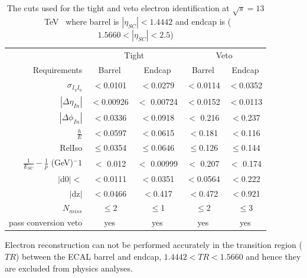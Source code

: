 \begin{table}[htpb!]
\footnotesize
\begin{center}
\begin{tabular}{|r|c|c|c|c|}
\hline
& \multicolumn{2}{c|}{Tight} & \multicolumn{2}{c|}{Veto} \\
\cline{2-5}
Requirements &  Barrel        &   Endcap  &  Barrel        &   Endcap  \\
\hline
$\sigma_{I_{\eta}I_{\eta}} $ & $ <$0.0101 & $ <$0.0279 & $ <$0.0114 & $ <$0.0352\\
$|\Delta \eta_{In}| $  & $ <$0.00926 &$ <$ 0.00724  & $ <$0.0152 & $ <$0.0113  \\
$|\Delta \phi_{In}|  $  &  $<$0.0336 & $<$0.0918 & $<$ 0.216 & $<$0.237  \\
$\frac{h}{E} $ &$<$0.0597 & $<$0.0615  &$<$0.181 & $<$0.116  \\
RelIso & $\leq$0.0354 & $\leq$0.0646& $\leq$0.126 & $\leq$0.144\\
$\frac{1}{E_{SC}} - \frac{1}{p}$ (GeV)$^-1$ & $<$ 0.012 & $<$ 0.00999  & $<$ 0.207 & $<$ 0.174 \\
$|$d$0| < $  & $<$0.0111 & $<$0.0351  & $<$0.0564 & $<$0.222\\
$|$dz$| $  & $<$0.0466 & $<$0.417 & $<$0.472 & $<$0.921\\
$N_{miss}$  & $\leq$2 & $\leq$1 & $\leq$2 & $\leq$3  \\
pass conversion veto & yes & yes& yes & yes  \\
\hline
\end{tabular}
\caption{The cuts used for the tight and veto electron identification at $\sqrt{s}=13$~TeV~\cite{electronID} where barrel is $|\eta_{SC}|< 1.4442$ and endcap is  ($1.5660<|\eta_{SC}|<2.5$)}
\label{tab:electron_tight_cuts13}
\end{center}
\end{table}

Electron reconstruction can not be performed accurately in the transition region ($TR$) between the ECAL barrel and endcap, $1.4442<TR<1.5660$ and hence they are excluded from physics analyses.

